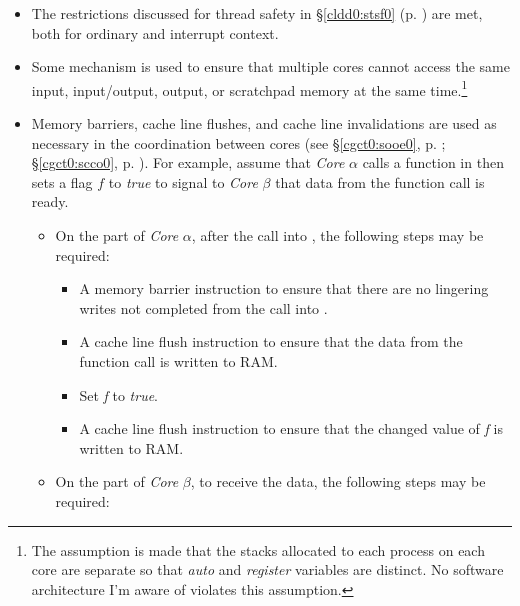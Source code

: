 \begin{itemize}
\item The restrictions discussed for thread safety in
      \S{}\ref{cldd0:stsf0} (p.  \pageref{cldd0:stsf0})
      are met, both for ordinary and interrupt context.
\item Some mechanism is used to ensure that multiple cores
      cannot access the same input, input/output, output, or 
      scratchpad memory at the same time.\footnote{The
      assumption is made that the stacks allocated to each
      process on each core are separate so that \emph{auto} 
      and \emph{register} variables are distinct.  No 
      software architecture I'm aware of violates this
      assumption.}
\item Memory barriers, cache line flushes, and cache line
      invalidations are used as necessary in the
      coordination between cores (see
      \S{}\ref{cgct0:sooe0}, p. \pageref{cgct0:sooe0};
      \S{}\ref{cgct0:scco0}, p. \pageref{cgct0:scco0}).
      For example, assume
      that \emph{Core} $\alpha$ calls a function in
      \emph{\productbasenameshort{}} then sets a flag
      $f$ to \emph{true} to
      signal to \emph{Core} $\beta$ that data from
      the function call is ready.
      \begin{itemize}
      \item On the part of \emph{Core} $\alpha$, after the
            call into \emph{\productbasenameshort{}}, the 
            following steps may be required:
            \begin{itemize}
            \item A memory barrier instruction to ensure
                  that there
                  are no lingering
                  writes not completed from the call into
                  \emph{\productbasenameshort{}}.
            \item A cache line flush instruction to ensure
                  that the data
                  from the function
                  call is written to RAM.
            \item Set \emph{f} to \emph{true}.
            \item A cache line flush instruction to ensure
                  that the changed value of
                  \emph{f} is written to RAM.
            \end{itemize}
      \item On the part of \emph{Core} $\beta$, to receive
            the data,
            the following steps may be required:
            \begin{itemize}

\end{itemize}
\end{itemize}
\end{itemize}
